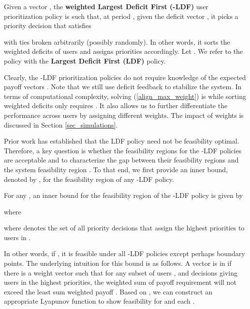 \documentclass[prodmode,acmtompecs]{acmsmall}
\newcommand{\myComments}[1]{}
\newif\ifinfocom
\newif\ifextended
\newif\ifdissertation
\newcommand{\infocomStart}{\ifinfocom \myComments{Infocom: }}
\newcommand{\extendedStart}{\ifextended  \myComments{Extended version: }}
\newcommand{\dissertationStart}{\ifdissertation  \myComments{Dissertation version: }}
\newcommand{\commentEnd}{\myComments{End}}
\begin{document}
\begin{definition}
\label{defn_w_LDF}
Given a vector , the {\bf weighted Largest Deficit First (-LDF)} user prioritization policy is such that, at period , given the deficit vector , it picks a priority decision  that satisfies

with ties broken arbitrarily (possibly randomly). In other words, it sorts the weighted deficits of users and assigns priorities accordingly. 
Let . 
We refer to the policy with  the {\bf Largest Deficit First (LDF)} policy. 
\end{definition}

\dissertationStart
The LDF policy has been explored before \cite{DiW06, JLS07, KWJ13} in the context of specific resource, workload and payoff models. We also generalize it to a class of policies with different weight vectors and provide better geometric characterization of the feasibility region. 
\commentEnd\fi

Clearly, the -LDF prioritization policies do not require knowledge of the expected payoff vectors .
Note that we still use deficit feedback to stabilize the system. 
In terms of computational complexity, solving (\ref{align_max_weight}) is  while sorting weighted deficits only requires . 
It also allows us to further differentiate the performance across users by assigning different weights. The impact of weights is discussed in Section \ref{sec_simulations}. 

Prior work has established that the LDF policy need not be feasibility optimal. Therefore, a key question is whether the feasibility regions for the -LDF policies are acceptable and to characterize the gap between their feasibility regions and the system feasibility region . 
To that end, we first provide an inner bound, denoted by , for the feasibility region of any -LDF policy. 

\begin{theorem}
\label{thm_R_IB}
For any , an inner bound for the feasibility region of the -LDF policy  is given by
 
where

where  denotes the set of all priority decisions that assign the highest  priorities to users in . 
\end{theorem}

In other words, if , it is feasible under all -LDF policies except perhaps boundary points. 
The underlying intuition for this bound is as follows. A vector  is in  if
there is a weight vector  such that for any subset of users , and decisions giving users in  the highest priorities, the weighted sum of payoff requirement  will not exceed the least sum weighted payoff . 
Based on , we can construct an appropriate Lyapunov function to show feasibility for  and each . 
\infocomStart
See the extended version of this paper \cite{EXT2} for the proof. 
\commentEnd\fi
\extendedStart
See Appendix \ref{appendix_pf_thm_R_IB_chap2} for the proof. 
\commentEnd\fi
\end{document}

